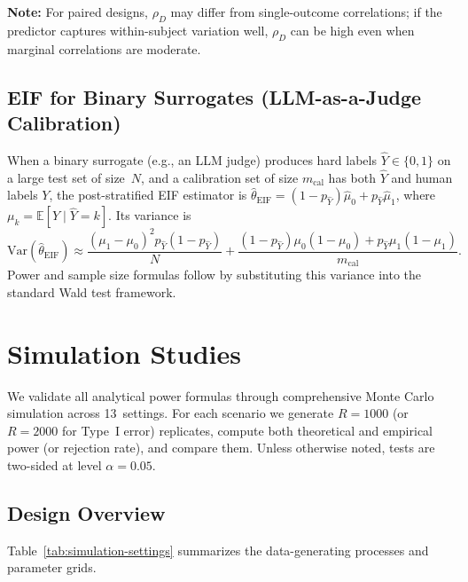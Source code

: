 \documentclass[11pt]{article}
\newcommand{\E}{\mathbb{E}}
\newcommand{\Var}{\mathrm{Var}}
\begin{document}
\begin{tcolorbox}
\textbf{Note:} For paired designs, $\rho_D$ may differ from
single-outcome correlations; if the predictor captures within-subject
variation well, $\rho_D$ can be high even when marginal correlations are
moderate.
\end{tcolorbox}

\subsection{EIF for Binary Surrogates (LLM-as-a-Judge Calibration)}
\label{sec:eif-binary}

When a binary surrogate (e.g., an LLM judge) produces hard labels
$\hat Y \in \{0,1\}$ on a large test set of size~$N$, and a calibration
set of size $m_{\text{cal}}$ has both $\hat Y$ and human labels $Y$, the
post-stratified EIF estimator is
$\hat\theta_{\mathrm{EIF}} = (1-p_{\hat Y})\hat\mu_0 + p_{\hat Y}\hat\mu_1$,
where $\mu_k = \E[Y \mid \hat Y = k]$.  Its variance is
\begin{equation}\label{eq:eif-binary-var}
\Var(\hat\theta_{\mathrm{EIF}}) \approx
  \frac{(\mu_1-\mu_0)^2 p_{\hat Y}(1-p_{\hat Y})}{N} +
  \frac{(1-p_{\hat Y})\mu_0(1-\mu_0) + p_{\hat Y}\mu_1(1-\mu_1)}
  {m_{\text{cal}}}.
\end{equation}
Power and sample size formulas follow by substituting this variance into
the standard Wald test framework.

\section{Simulation Studies}
\label{sec:simulation}

We validate all analytical power formulas through comprehensive Monte
Carlo simulation across 13~settings.  For each scenario we generate
$R=1000$ (or $R=2000$ for Type~I error) replicates, compute both
theoretical and empirical power (or rejection rate), and compare them.
Unless otherwise noted, tests are two-sided at level $\alpha = 0.05$.

\subsection{Design Overview}

Table~\ref{tab:simulation-settings} summarizes the data-generating
processes and parameter grids.
\end{document}
